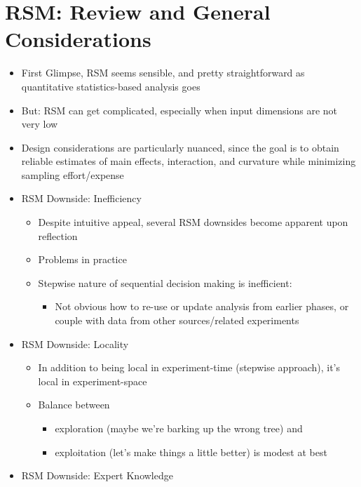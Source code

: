 \documentclass[
  letterpaper,
  DIV=11,
  numbers=noendperiod]{scrreprt}
\providecommand{\tightlist}{%
  \setlength{\itemsep}{0pt}\setlength{\parskip}{0pt}}\usepackage{longtable,booktabs,array}
\begin{document}
\section{RSM: Review and General
Considerations}\label{rsm-review-and-general-considerations}

\begin{itemize}
\item
  First Glimpse, RSM seems sensible, and pretty straightforward as
  quantitative statistics-based analysis goes
\item
  But: RSM can get complicated, especially when input dimensions are not
  very low
\item
  Design considerations are particularly nuanced, since the goal is to
  obtain reliable estimates of main effects, interaction, and curvature
  while minimizing sampling effort/expense
\item
  RSM Downside: Inefficiency

  \begin{itemize}
  \tightlist
  \item
    Despite intuitive appeal, several RSM downsides become apparent upon
    reflection
  \item
    Problems in practice
  \item
    Stepwise nature of sequential decision making is inefficient:

    \begin{itemize}
    \tightlist
    \item
      Not obvious how to re-use or update analysis from earlier phases,
      or couple with data from other sources/related experiments
    \end{itemize}
  \end{itemize}
\item
  RSM Downside: Locality

  \begin{itemize}
  \tightlist
  \item
    In addition to being local in experiment-time (stepwise approach),
    it's local in experiment-space
  \item
    Balance between

    \begin{itemize}
    \tightlist
    \item
      exploration (maybe we're barking up the wrong tree) and
    \item
      exploitation (let's make things a little better) is modest at best
    \end{itemize}
  \end{itemize}
\item
  RSM Downside: Expert Knowledge


\end{itemize}
\end{document}
